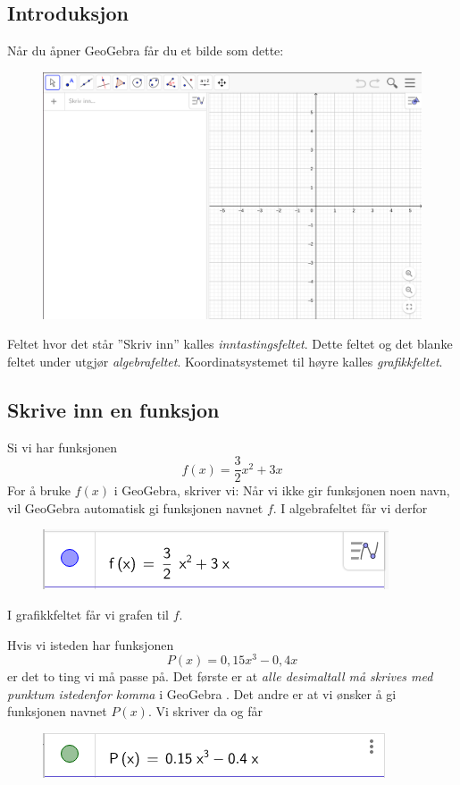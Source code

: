 



\subsection{Introduksjon}
Når du åpner GeoGebra får du et bilde som dette:
\begin{figure}[H]
	\centering
	\includegraphics[scale=0.1]{ggbalgoggraf}
\end{figure}
Feltet hvor det står ''Skriv inn'' kalles \textit{inntastingsfeltet}. Dette feltet og det blanke feltet under utgjør \textit{algebrafeltet}. Koordinatsystemet til høyre kalles \textit{grafikkfeltet}.

\subsection{Skrive inn en funksjon}
Si vi har funksjonen 
\[f(x)= \frac{3}{2} x^2 + 3x \]
For å bruke $ f(x) $ i GeoGebra, skriver vi:
Når vi ikke gir funksjonen noen navn, vil GeoGebra automatisk gi funksjonen navnet $ f $. I algebrafeltet får vi derfor
\begin{figure}[H]
	\centering
	\includegraphics[scale=0.5]{skrivf}
\end{figure}
I grafikkfeltet får vi grafen til $ f $. \vsk

Hvis vi isteden har funksjonen
\[ P(x)= 0,15x^3 - 0,4 x\]
er det to ting vi må passe på. Det første er at \textsl{alle desimaltall må skrives med punktum istedenfor komma} i GeoGebra
. Det andre er at vi ønsker å gi funksjonen navnet $ P(x) $. Vi skriver da
og får \vspace{-5pt}
\begin{figure}[H]
	\centering
	\includegraphics[scale=0.5]{pfig}
\end{figure}

